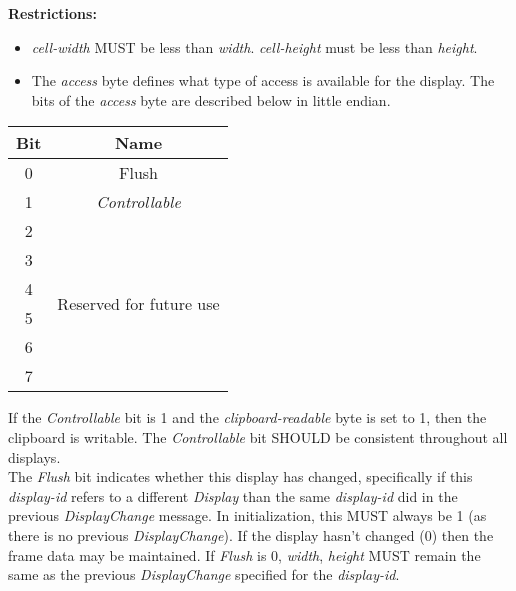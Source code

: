 \textbf{Restrictions:}

\begin{itemize}
    \item \emph{cell-width} MUST be less than \emph{width}. \emph{cell-height} must be less than \emph{height}.\\
    \item The \emph{access} byte defines what type of access is available for the display. The bits of the
    \emph{access} byte are described below in little endian.
\end{itemize}


\begin{center}
    \begin{tabular}{|c|c|}
        \hline
        \textbf{Bit} & \textbf{Name}                               \\
        \hline
        0            & Flush                                       \\
        \hline
        1            & \emph{Controllable}                         \\
        \hline
        2            & \multirow{6}{10em}{Reserved for future use} \\
        3            &                                             \\
        4            &                                             \\
        5            &                                             \\
        6            &                                             \\
        7            &                                             \\
        \hline
    \end{tabular}
\end{center}

If the \emph{Controllable} bit is 1 and the \emph{clipboard-readable} byte is set to 1, then the clipboard is
writable. The \emph{Controllable} bit SHOULD be consistent throughout all displays.\\

The \emph{Flush} bit indicates whether this display has changed, specifically if this \emph{display-id} refers to
a different \emph{Display} than the same \emph{display-id} did in the previous \emph{DisplayChange} message. In
initialization, this MUST always be 1 (as there is no previous \emph{DisplayChange}). If the display hasn't
changed (0) then the frame data may be maintained. If \emph{Flush} is 0, \emph{width}, \emph{height} MUST remain
the same as the previous \emph{DisplayChange} specified for the \emph{display-id}.\\


